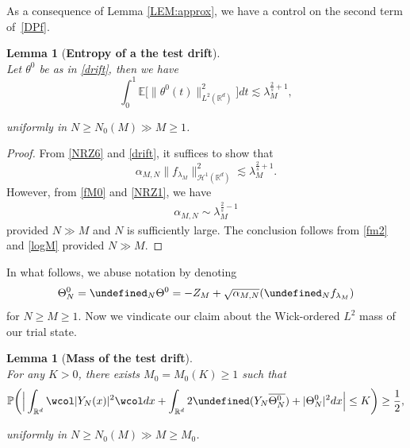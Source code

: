 \documentclass[%
11pt,  reqno]{amsart}
\newtheorem{lemma}[theorem]{Lemma}
\theoremstyle{remarkstyle}
\newcommand{\1}{\hspace{0.2mm}\text{I}\hspace{0.2mm}}
\newcommand{\noi}{\noindent}
\newcommand{\R}{\mathbb{R}}
\let\Re=\undefined\DeclareMathOperator*{\Re}{Re}
\let\P= \undefined
\newcommand{\P}{\mathbf{P}}
\newcommand{\E}{\mathbb{E}}
\newcommand{\al}{\alpha}
\newcommand{\ld}{\lambda}
\newcommand{\cj}{\overline}
\newcommand{\wick}[1]{\wcol#1\wcol}
\newcommand{\les}{\lesssim}
\renewcommand{\H}{\mathcal{H}}
\newcommand{\PP}{\mathbb{P}}
\numberwithin{equation}{section}
\numberwithin{theorem}{section}
\newcommand{\Dr}{\Theta}
\begin{document}
	As a consequence of Lemma \ref{LEM:approx}, we have a control on the second term of~\eqref{DPf}.
	\begin{lemma}[\textbf{Entropy of a the test drift}]
		\label{LEM:bddrift}\mbox{}\\
		Let $\theta^0$ be as in \eqref{drift},
		then we have
		\[
		\int_0^1 \E \big[\| \theta^0 (t)\|_{L^2 ({\R^d})}^2 \big] dt \les \ld_M^{\frac2s + 1},
		\]
		
		\noi
		uniformly in $N \ge N_0(M) \gg M \ge 1$.
	\end{lemma}
	
	\begin{proof}
		From \eqref{NRZ6} and \eqref{drift}, it suffices to show that
		\[
		\al_{M, N} \|  f_{\ld_M} \|_{\H^1({\R^d})}^2 \les   \ld_M^{\frac2s+1}.
		\]
		However, from \eqref{fM0} and \eqref{NRZ1}, we have
		\begin{align}
			\al_{M, N} \sim \ld_M^{\frac2{s} - 1}
			\label{logM}
		\end{align}
		provided $N \gg M$ and $N$ is sufficiently large. The conclusion follows from \eqref{fm2} and \eqref{logM} provided $N \gg M$.
	\end{proof}
	
	In what follows, we abuse notation by denoting
	\begin{align}
		\Dr^0_N = \P_{N} \Dr^0
		= -Z_M +  \sqrt{\al_{M,N}} 
		(\P_{N} f_{\ld_M})
		\label{YY0a}
	\end{align}
	for $N \ge M \ge 1$. Now we vindicate our claim about the Wick-ordered $L^2$ mass of our trial state. 
	
	\begin{lemma}[\textbf{Mass of the test drift}]
		\label{LEM:key}\mbox{}\\
		For any $K>0$, there exists $M_0=M_0(K) \geq 1$ such that 
		\begin{align}
			\PP\bigg( \Big| \int_{\R^d} \wick{|Y_N (x)|^2} dx + \int_{\R^d} 2 \Re(Y_N \cj{\Dr^0_N}) + |\Dr^0_N|^2  dx \Big| \le K \bigg) 
			\ge \frac 12, 
			\label{pa5}
		\end{align}
		
		\noi
		uniformly in $N \ge N_0(M) \gg M \ge M_0$.
	\end{lemma}
	
\end{document}
